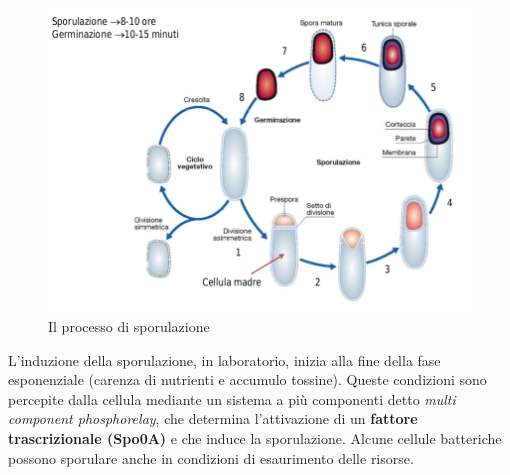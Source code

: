 \documentclass[11pt]{book}
\begin{document}
\clearpage

\begin{figure}[htp]
\centering
\includegraphics[scale=0.4]{img/Sporulazione.png}
\caption{Il processo di sporulazione}
\label{}
\end{figure}

L'induzione della sporulazione, in laboratorio, inizia alla fine della fase esponenziale (carenza di nutrienti e accumulo tossine).
Queste condizioni sono percepite dalla cellula mediante un sistema a più componenti detto \emph{multi component phosphorelay}, che determina l’attivazione di un \textbf{fattore trascrizionale (Spo0A)} e che induce la sporulazione.
Alcune cellule batteriche possono sporulare anche in condizioni di esaurimento delle risorse.
\end{document}

